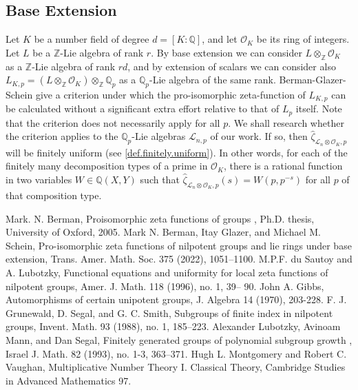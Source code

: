 \documentclass[12pt]{article}
\begin{document}
\subsection{Base Extension}
Let $K$ be a number field of degree $d=[K:\mathbb{Q}]$, and let $\mathcal{O}_K$ be its ring of integers. Let $L$ be a $\mathbb{Z}$-Lie algebra of rank $r$. By base extension we can consider $L\otimes_{\mathbb{Z}}\mathcal{O}_K$ as a $\mathbb{Z}$-Lie algebra of rank $rd$, and by extension of scalars we can consider also $L_{K,p}=(L\otimes_{\mathbb{Z}}\mathcal{O}_K)\otimes_{\mathbb{Z}}\mathbb{Q}_p$ as a $\mathbb{Q}_p$-Lie algebra of the same rank. Berman-Glazer-Schein\cite{BermanGlazerSchein} give a criterion under which the pro-isomorphic zeta-function of $L_{K,p}$ can be calculated without a significant extra effort relative to that of $L_p$ itself. Note that the criterion does not necessarily apply for all $p$. We shall research whether the criterion applies to the $\mathbb{Q}_p$-Lie algebras $\mathcal{L}_{n,p}$ of our work. If so, then $\hat\zeta_{\mathcal{L}_n\otimes\mathcal{O}_K,p}$ will be finitely uniform (see \ref{def.finitely.uniform}). In other words, for each of the finitely many decomposition types of a prime in $\mathcal{O}_K$, there is a rational function in two variables $W\in\mathbb{Q}(X,Y)$ such that $\hat\zeta_{\mathcal{L}_n\otimes\mathcal{O}_K,p}(s)=W(p,p^{-s})$ for all $p$ of that composition type.
\begin{thebibliography}{2}
 Mark. N. Berman,
Proisomorphic zeta functions of groups
, Ph.D. thesis, University of Oxford,
2005.
 Mark N. Berman, Itay Glazer, and Michael M. Schein, Pro-isomorphic zeta functions of nilpotent groups and lie rings under base extension, Trans. Amer. Math. Soc. 375 (2022), 1051–1100.
 M.P.F. du Sautoy and A. Lubotzky, Functional equations and uniformity for
local zeta functions of nilpotent groups, Amer. J. Math. 118 (1996), no. 1, 39–
90.
 John A. Gibbs, Automorphisms of certain unipotent groups, J. Algebra 14 (1970), 203-228.
 F. J. Grunewald, D. Segal, and G. C. Smith, Subgroups of finite index in nilpotent groups,
Invent. Math. 93 (1988), no. 1, 185–223.
 Alexander Lubotzky, Avinoam Mann, and Dan Segal,
Finitely generated groups of polynomial
subgroup growth
, Israel J. Math.
82
(1993), no. 1-3, 363–371.
 Hugh L. Montgomery and Robert C. Vaughan, Multiplicative Number Theory I. Classical Theory, Cambridge Studies in Advanced Mathematics 97.
\end{thebibliography}
\end{document}
